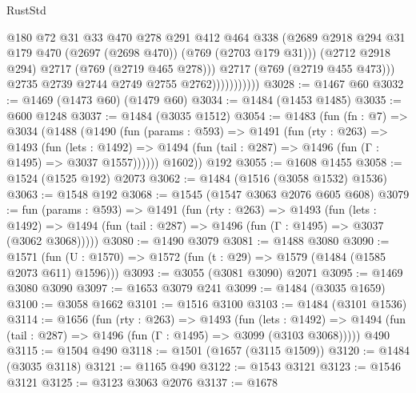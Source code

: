 \begin{lexlean}{RustStd}
\begin{coremodule}
                              @180
                              @72
                              @31
                              @33
                              @470
                              @278
                              @291
                              @412
                              @464
                              @338
                              (@2689
                                @2918
                                @294
                                @31
                                @179
                                @470
                                (@2697 (@2698 @470))
                                (@769 (@2703 @179 @31)))
                              (@2712 @2918 @294)
                              @2717
                              (@769 (@2719 @465 @278)))
                            @2717
                            (@769 (@2719 @455 @473)))
                          @2735
                          @2739
                          @2744
                          @2749
                          @2755
                          @2762)))))))))))
@3028 := @1467 @60
@3032 := @1469 (@1473 @60) (@1479 @60)
@3034 := @1484 (@1453 @1485)
@3035 := @600 @1248
@3037 := @1484 (@3035 @1512)
@3054 := @1483
    (fun (fn : @7) =>
    @3034
      (@1488
        (@1490
          (fun (params : @593) =>
          @1491
            (fun (rty : @263) =>
            @1493
              (fun (lets : @1492) =>
              @1494 (fun (tail : @287) => @1496 (fun (Γ : @1495) => @3037 @1557))))))
        @1602))
    @192
@3055 := @1608 @1455
@3058 := @1524 (@1525 @192) @2073
@3062 := @1484 (@1516 (@3058 @1532) @1536)
@3063 := @1548 @192
@3068 := @1545 (@1547 @3063 @2076 @605 @608)
@3079 := fun (params : @593) =>
  @1491
    (fun (rty : @263) =>
    @1493
      (fun (lets : @1492) =>
      @1494 (fun (tail : @287) => @1496 (fun (Γ : @1495) => @3037 (@3062 @3068)))))
@3080 := @1490 @3079
@3081 := @1488 @3080
@3090 := @1571 (fun (U : @1570) => @1572 (fun (t : @29) => @1579 (@1484 (@1585 @2073 @611) @1596)))
@3093 := @3055 (@3081 @3090) @2071
@3095 := @1469 @3080 @3090
@3097 := @1653 @3079 @241
@3099 := @1484 (@3035 @1659)
@3100 := @3058 @1662
@3101 := @1516 @3100
@3103 := @1484 (@3101 @1536)
@3114 := @1656
    (fun (rty : @263) =>
    @1493
      (fun (lets : @1492) =>
      @1494 (fun (tail : @287) => @1496 (fun (Γ : @1495) => @3099 (@3103 @3068)))))
    @490
@3115 := @1504 @490
@3118 := @1501 (@1657 (@3115 @1509))
@3120 := @1484 (@3035 @3118)
@3121 := @1165 @490
@3122 := @1543 @3121
@3123 := @1546 @3121
@3125 := @3123 @3063 @2076
@3137 := @1678

\end{coremodule}
\end{lexlean}

